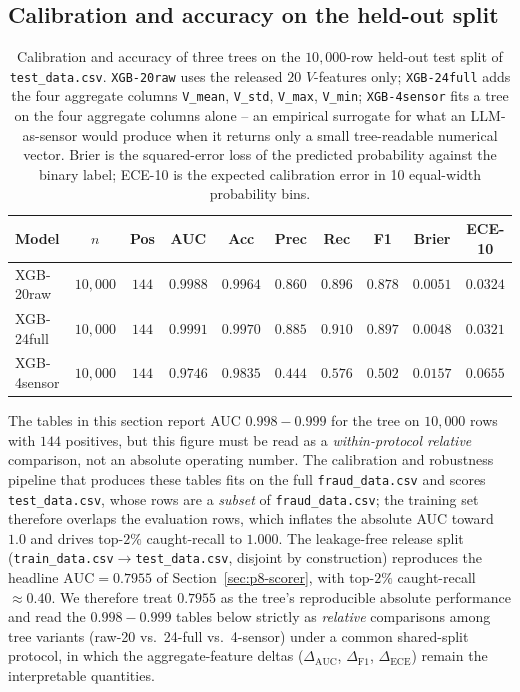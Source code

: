 \documentclass{article}
\providecommand{\secref}[1]{Section~\ref{#1}}
\begin{document}
\subsection{Calibration and accuracy on the held-out split}

\begin{table}[t]
\centering
\small
\caption{Calibration and accuracy of three trees on the $10{,}000$-row
held-out test split of \texttt{test\_data.csv}. \texttt{XGB-20raw} uses
the released $20$ $V$-features only; \texttt{XGB-24full} adds the four
aggregate columns \texttt{V\_mean}, \texttt{V\_std}, \texttt{V\_max},
\texttt{V\_min}; \texttt{XGB-4sensor} fits a tree on the four aggregate
columns alone -- an empirical surrogate for what an LLM-as-sensor would
produce when it returns only a small tree-readable numerical vector.
Brier is the squared-error loss of the predicted probability against
the binary label; ECE-10 is the expected calibration error in 10
equal-width probability bins.}
\label{tab:p8-evidence-cal}
\begin{tabular}{lccccccccc}
\toprule
Model & $n$ & Pos & AUC & Acc & Prec & Rec & F1 & Brier & ECE-10 \\
\midrule
XGB-20raw    & $10{,}000$ & $144$ & $0.9988$ & $0.9964$ & $0.860$ & $0.896$ & $0.878$ & $0.0051$ & $0.0324$ \\
XGB-24full   & $10{,}000$ & $144$ & $0.9991$ & $0.9970$ & $0.885$ & $0.910$ & $0.897$ & $0.0048$ & $0.0321$ \\
XGB-4sensor  & $10{,}000$ & $144$ & $0.9746$ & $0.9835$ & $0.444$ & $0.576$ & $0.502$ & $0.0157$ & $0.0655$ \\
\bottomrule
\end{tabular}
\end{table}

The tables in this section report AUC $0.998{-}0.999$ for the tree on
$10{,}000$ rows with $144$ positives, but this figure must be read as a
\emph{within-protocol relative} comparison, not an absolute operating
number. The calibration and robustness pipeline that produces these tables
fits on the full \texttt{fraud\_data.csv} and scores
\texttt{test\_data.csv}, whose rows are a \emph{subset} of
\texttt{fraud\_data.csv}; the training set therefore overlaps the
evaluation rows, which inflates the absolute AUC toward $1.0$ and drives
top-$2\%$ caught-recall to $1.000$. The leakage-free release split
(\texttt{train\_data.csv}$\to$\texttt{test\_data.csv}, disjoint by
construction) reproduces the headline $\mathrm{AUC}{=}0.7955$ of
\secref{sec:p8-scorer}, with top-$2\%$ caught-recall $\approx 0.40$. We
therefore treat $0.7955$ as the tree's reproducible absolute performance
and read the $0.998{-}0.999$ tables below strictly as \emph{relative}
comparisons among tree variants (raw-20 vs.\ 24-full vs.\ 4-sensor) under a
common shared-split protocol, in which the aggregate-feature deltas
($\Delta_{\mathrm{AUC}}$, $\Delta_{\mathrm{F1}}$, $\Delta_{\mathrm{ECE}}$)
remain the interpretable quantities.
\end{document}
